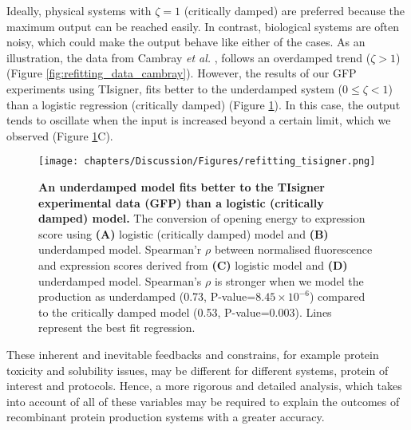 Ideally, physical systems with $\zeta = 1$ (critically damped) are preferred because the maximum output can be reached easily. In contrast, biological systems are often noisy, which could make the output behave like either of the cases. As an illustration, the data from Cambray \textit{et al.} \cite{Cambray2018-kn}, follows an overdamped trend ($\zeta > 1$) (Figure \ref{fig:refitting_data_cambray}). However, the results of our GFP experiments using TIsigner, fits better to the underdamped system ($0 \leq \zeta < 1 $) than a logistic regression (critically damped) (Figure \ref{fig:refitting_data_tisigner}). In this case, the output tends to oscillate when the input is increased beyond a certain limit, which we observed (Figure \ref{fig:refitting_data_tisigner}C).


\begin{figure}[htbp!]
\center
\texttt{[image: chapters/Discussion/Figures/refitting\_tisigner.png]}
\caption[An underdamped model fits better to the TIsigner experimental data (GFP) than a logistic (critically damped) model.]{\textbf{An underdamped model fits better to the TIsigner experimental data (GFP) than a logistic (critically damped) model.} The conversion of opening energy to expression score using \textbf{(A)} logistic (critically damped) model and  \textbf{(B)} underdamped model. Spearman'r $\rho$ between normalised fluorescence and expression scores derived from \textbf{(C)} logistic model and \textbf{(D)} underdamped model. Spearman's $\rho$ is stronger when we model the production as underdamped (0.73, P-value=$8.45\times 10^{-6}$) compared to the critically damped model (0.53, P-value=0.003). Lines represent the best fit regression.}%
\label{fig:refitting_data_tisigner}
\end{figure}

 These inherent and inevitable feedbacks and constrains, for example protein toxicity and solubility issues, may be different for different systems, protein of interest and protocols. Hence, a more rigorous and detailed analysis, which takes into account of all of these variables may be required to explain the outcomes of recombinant protein production systems with a greater accuracy.


